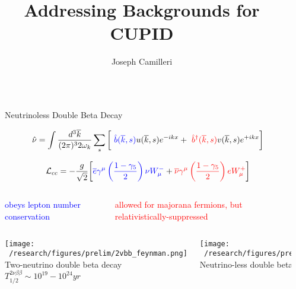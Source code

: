 \documentclass[final]{beamer}
\title{Addressing Backgrounds for CUPID}
\author{Joseph Camilleri} %
\institute[shortinst]{Virginia Tech} %
\newlength{\sepwidth}
\newlength{\colwidth}
\newcommand{\separatorcolumn}{\begin{column}{\sepwidth}\end{column}}
\begin{document}
\begin{frame}[t]
\begin{columns}[t]
\separatorcolumn

\begin{column}{\colwidth}

  \begin{block}{Neutrinoless Double Beta Decay}
    
      \begin{eqnarray*}
      \hat{\nu} = \int \frac{d^3 \overline{k}}{(2\pi)^3 2 \omega_k} \sum_s
      \bigg[\ \textcolor{blue}{\hat{b}(\overline{k},s)}u(\overline{k},s)e^{-ikx}
       + \ \textcolor{red}{\hat{b}^{\dagger}(\overline{k},s)}v(\overline{k},s)e^{+ikx} \bigg]
      \end{eqnarray*}
      
      \begin{eqnarray*}
      \mathcal{L}_{cc} = -\frac{g}{\sqrt{2}}\bigg[\textcolor{blue}{\overline{e}\gamma^{\mu}\left(\frac{1-\gamma_5}{2}\right)\nu W^{-}_{\mu}} 
      + \textcolor{red}{\overline{\nu}\gamma^{\mu}\left(\frac{1-\gamma_5}{2}\right)e W^{+}_{\mu}}\bigg]
      \end{eqnarray*}
      
      \begin{columns}[c] %
        
        \column{.4\colwidth} %
        \textcolor{blue} {obeys lepton number conservation} 
        
        \column{.4\colwidth} %
        \textcolor{red} {allowed for majorana fermions, but relativistically-suppressed}
        
      \end{columns}
      
      \vspace{1cm}
    \begin{columns}[c] %
        
        \column{.35\colwidth} %
        \texttt{[image: ~/research/figures/prelim/2vbb\_feynman.png]}
        {\footnotesize Two-neutrino double beta decay $T_{1/2}^{2\nu\beta\beta} \sim 10^{19}-10^{24} yr$}
        
        \column{.35\colwidth} %
        \texttt{[image: ~/research/figures/prelim/0vbb\_feynman.png]}
        {\footnotesize Neutrino-less double beta decay $T_{1/2}^{0\nu\beta\beta} > 10^{26} yr$}
        

\end{columns}
\end{block}
\end{column}
\end{columns}
\end{frame}
\end{document}
